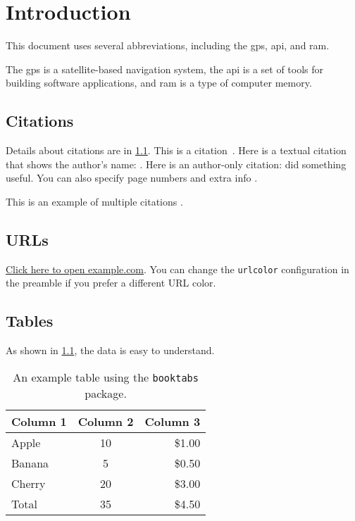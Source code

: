 \chapter{Introduction}
\label{ch:intro}

This document uses several abbreviations, including the \gls{gps}, \gls{api}, and \gls{ram}.

The \gls{gps} is a satellite-based navigation system, the \gls{api} is a set of tools for building software applications, and \gls{ram} is a type of computer memory.


\section{Citations}
\label{sec:citations}
Details about citations are in \cref{sec:citations}.
This is a citation~\cite{wagner2024optimized}. 
Here is a textual citation that shows the author's name: \textcite{wagner2024optimized}. 
Here is an author-only citation: \citeauthor{wagner2024optimized} did something useful.
You can also specify page numbers and extra info \cite[see][p.~5]{wagner2024optimized}. 

This is an example of multiple citations \cite{Bocklet2014ErlangenCLPLarge, Bocklet2013AutomaticPhonemeAnalysis, Bocklet2009TowardsLanguageindependenta}.


\section{URLs}
\href{https://www.example.com}{Click here to open example.com}. You can change the \texttt{urlcolor} configuration in the preamble if you prefer a different URL color.

\section{Tables}
As shown in \cref{tab:example}, the data is easy to understand.
\begin{table}[ht]
    \centering
    \begin{tabular}{lcr}
        \toprule
        \textbf{Column 1} & \textbf{Column 2} & \textbf{Column 3} \\ 
        \midrule
        Apple             & 10                & \$1.00            \\
        Banana            & 5                 & \$0.50            \\
        Cherry            & 20                & \$3.00            \\
        \midrule
        Total             & 35                & \$4.50            \\
        \bottomrule
    \end{tabular}
    \caption{An example table using the \texttt{booktabs} package.}
    \label{tab:example}
\end{table}

